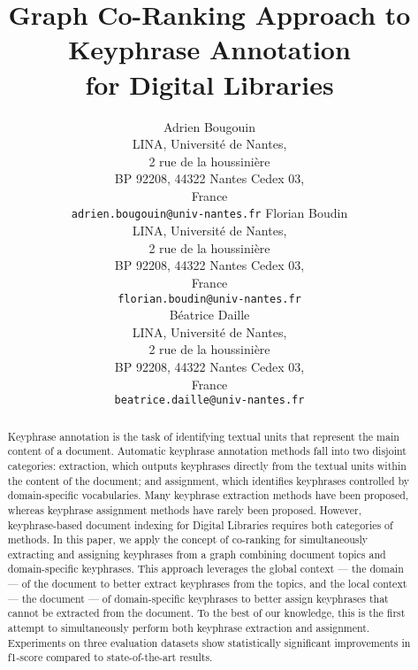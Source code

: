 \documentclass[11pt]{article}
\title{Graph Co-Ranking Approach to Keyphrase Annotation\\for Digital Libraries}
\author{
  Adrien Bougouin\\
  LINA, Université de Nantes,\\
  2 rue de la houssinière\\
  BP 92208, 44322 Nantes Cedex 03,\\
  France\\
  {\tt adrien.bougouin@univ-nantes.fr} %
  Florian Boudin\\
  LINA, Université de Nantes,\\
  2 rue de la houssinière\\
  BP 92208, 44322 Nantes Cedex 03,\\
  France\\
  {\tt florian.boudin@univ-nantes.fr}\\\And
  Béatrice Daille\\
  LINA, Université de Nantes,\\
  2 rue de la houssinière\\
  BP 92208, 44322 Nantes Cedex 03,\\
  France\\
  {\tt beatrice.daille@univ-nantes.fr}\\
}
\date{}
\begin{document}
  \maketitle
  \begin{abstract}
    Keyphrase annotation is the task of identifying textual units that represent the main content of a document.
    Automatic keyphrase annotation methods fall into two disjoint categories: extraction, which outputs keyphrases directly from the textual units within the content of the document; and assignment, which identifies keyphra\-ses controlled by domain-specific vocabularies.
    Many keyphrase extraction methods have been proposed, whereas keyphrase assignment methods have rarely been proposed. %
    However, keyphrase-based document indexing for Digital Libraries requires both categories of methods.
    In this paper, we apply the concept of co-ranking for simultaneously extracting and assigning keyphrases from a graph combining document topics and domain-specific keyphrases.
    This approach leverages the global context --- the domain --- of the document to better extract key\-phrases from the topics, and the local context --- the document --- of domain-specific keyphrases to better assign keyphrases that cannot be extracted from the document.
    To the best of our knowledge, this is the first attempt to simultaneously perform both keyphrase extraction and assignment.
    Experiments on three evaluation datasets show statistically significant improvements in f1-score compared to state-of-the-art results.

  \end{abstract}
    
  
  
  
  
  
  
  

  
  
\end{document}
